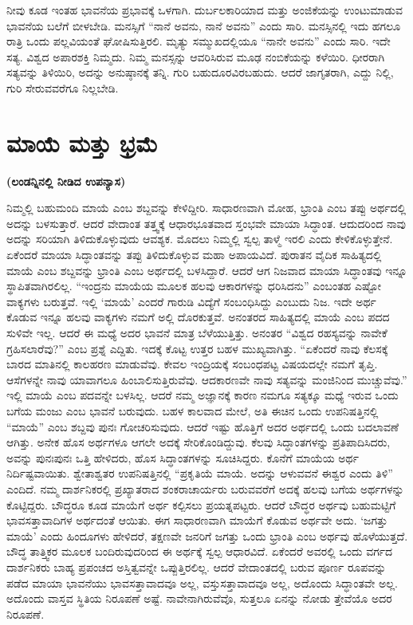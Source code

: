ನೀವು ಕೂಡ ಇಂತಹ ಭಾವನೆಯ ಪ್ರಭಾವಕ್ಕೆ ಒಳಗಾಗಿ. ದುರ್ಬಲಕಾರಿಯಾದ ಮತ್ತು ಅಂಜಿಕೆಯನ್ನು ಉಂಟುಮಾಡುವ ಭಾವನೆಯ ಬಲೆಗೆ ಬೀಳಬೇಡಿ. ಮನಸ್ಸಿಗೆ “ನಾನೆ ಅವನು, ನಾನೆ ಅವನು” ಎಂದು ಸಾರಿ. ಮನಸ್ಸಿನಲ್ಲಿ ಇದು ಹಗಲೂ ರಾತ್ರಿ ಒಂದು ಪಲ್ಲವಿಯಂತೆ ಘೋಷಿಸುತ್ತಿರಲಿ. ಮೃತ್ಯು ಸಮ್ಮುಖದಲ್ಲಿಯೂ “ನಾನೇ ಅವನು” ಎಂದು ಸಾರಿ. ಇದೇ ಸತ್ಯ. ವಿಶ್ವದ ಅಪಾರಶಕ್ತಿ ನಿಮ್ಮದು. ನಿಮ್ಮ ಮನಸ್ಸನ್ನು ಆವರಿಸಿರುವ ಮೂಢ ನಂಬಿಕೆಯನ್ನು ಕಳೆಯಿರಿ. ಧೀರರಾಗಿ ಸತ್ಯವನ್ನು ತಿಳಿಯಿರಿ, ಅದನ್ನು ಅನುಷ್ಠಾನಕ್ಕೆ ತನ್ನಿ. ಗುರಿ ಬಹುದೂರವಿರಬಹುದು. ಆದರೆ ಜಾಗೃತರಾಗಿ, ಎದ್ದು ನಿಲ್ಲಿ, ಗುರಿ ಸೇರುವವರೆಗೂ ನಿಲ್ಲಬೇಡಿ.

\chapter{ಮಾಯೆ ಮತ್ತು ಭ್ರಮೆ}

\centerline{\textbf{(ಲಂಡನ್ನಿನಲ್ಲಿ ನೀಡಿದ ಉಪನ್ಯಾಸ)}}

ನಿಮ್ಮಲ್ಲಿ ಬಹುಮಂದಿ ಮಾಯೆ ಎಂಬ ಶಬ್ದವನ್ನು ಕೇಳಿದ್ದೀರಿ. ಸಾಧಾರಣವಾಗಿ ಮೋಹ, ಭ್ರಾಂತಿ ಎಂಬ ತಪ್ಪು ಅರ್ಥದಲ್ಲಿ ಅದನ್ನು ಬಳಸುತ್ತಾರೆ. ಆದರೆ ವೇದಾಂತ ತತ್ತ್ವಕ್ಕೆ ಆಧಾರಭೂತವಾದ ಸ್ತಂಭವೇ ಮಾಯಾ ಸಿದ್ಧಾಂತ. ಆದುದರಿಂದ ನಾವು ಅದನ್ನು ಸರಿಯಾಗಿ ತಿಳಿದುಕೊಳ್ಳುವುದು ಆವಶ್ಯಕ. ಮೊದಲು ನಿಮ್ಮಲ್ಲಿ ಸ್ವಲ್ಪ ತಾಳ್ಮೆ ಇರಲಿ ಎಂದು ಕೇಳಿಕೊಳ್ಳುತ್ತೇನೆ. ಏಕೆಂದರೆ ಮಾಯಾ ಸಿದ್ಧಾಂತವನ್ನು ತಪ್ಪು ತಿಳಿದುಕೊಳ್ಳುವ ಮಹಾ ಅಪಾಯವಿದೆ. ಪುರಾತನ ವೈದಿಕ ಸಾಹಿತ್ಯದಲ್ಲಿ ಮಾಯೆ ಎಂಬ ಶಬ್ದವನ್ನು ಭ್ರಾಂತಿ ಎಂಬ ಅರ್ಥದಲ್ಲಿ ಬಳಸಿದ್ದಾರೆ. ಆದರೆ ಆಗ ನಿಜವಾದ ಮಾಯಾ ಸಿದ್ಧಾಂತವು ಇನ್ನೂ ಸ್ಥಾಪಿತವಾಗಿರಲಿಲ್ಲ. “ಇಂದ್ರನು ಮಾಯೆಯ ಮೂಲಕ ಹಲವು ಆಕಾರಗಳನ್ನು ಧರಿಸಿದನು” ಎಂಬಂತಹ ಎಷ್ಟೋ ವಾಕ್ಯಗಳು ಬರುತ್ತವೆ. ಇಲ್ಲಿ ‘ಮಾಯೆ’ ಎಂದರೆ ಗಾರುಡಿ ವಿದ್ಯೆಗೆ ಸಂಬಂಧಿಸಿದ್ದು ಎಂಬುದು ನಿಜ. ಇದೇ ಅರ್ಥ ಕೊಡುವ ಇನ್ನೂ ಹಲವು ವಾಕ್ಯಗಳು ನಮಗೆ ಅಲ್ಲಿ ದೊರಕುತ್ತವೆ. ಅನಂತರದ ಸಾಹಿತ್ಯದಲ್ಲಿ ಮಾಯೆ ಎಂಬ ಪದದ ಸುಳಿವೇ ಇಲ್ಲ. ಆದರೆ ಈ ಮಧ್ಯೆ ಅದರ ಭಾವನೆ ಮಾತ್ರ ಬೆಳೆಯುತ್ತಿತ್ತು. ಅನಂತರ “ವಿಶ್ವದ ರಹಸ್ಯವನ್ನು ನಾವೇಕೆ ಗ್ರಹಿಸಲಾರೆವು?” ಎಂಬ ಪ್ರಶ್ನೆ ಎದ್ದಿತು. ಇದಕ್ಕೆ ಕೊಟ್ಟ ಉತ್ತರ ಬಹಳ ಮುಖ್ಯವಾಗಿತ್ತು. “ಏಕೆಂದರೆ ನಾವು ಕೆಲಸಕ್ಕೆ ಬಾರದ ಮಾತಿನಲ್ಲಿ ಕಾಲಹರಣ ಮಾಡುವೆವು. ಕೇವಲ ಇಂದ್ರಿಯಕ್ಕೆ ಸಂಬಂಧಪಟ್ಟ ವಿಷಯದಲ್ಲೇ ನಮಗೆ ತೃಪ್ತಿ. ಆಸೆಗಳನ್ನೇ ನಾವು ಯಾವಾಗಲೂ ಹಿಂಬಾಲಿಸುತ್ತಿರುವೆವು. ಆದಕಾರಣವೇ ನಾವು ಸತ್ಯವನ್ನು ಮಂಜಿನಿಂದ ಮುಚ್ಚುವೆವು.” ಇಲ್ಲಿ ಮಾಯೆ ಎಂಬ ಪದವನ್ನೇ ಬಳಸಿಲ್ಲ. ಆದರೆ ನಮ್ಮ ಅಜ್ಞಾನಕ್ಕೆ ಕಾರಣ ನಮಗೂ ಸತ್ಯಕ್ಕೂ ಮಧ್ಯೆ ಇರುವ ಒಂದು ಬಗೆಯ ಮಂಜು ಎಂಬ ಭಾವನೆ ಬರುವುದು. ಬಹಳ ಕಾಲವಾದ ಮೇಲೆ, ಅತಿ ಈಚಿನ ಒಂದು ಉಪನಿಷತ್ತಿನಲ್ಲಿ “ಮಾಯೆ” ಎಂಬ ಶಬ್ದವು ಪುನಃ ಗೋಚರಿಸುವುದು. ಆದರೆ ಇಷ್ಟು ಹೊತ್ತಿಗೆ ಅದರ ಅರ್ಥದಲ್ಲಿ ಒಂದು ಬದಲಾವಣೆ ಆಗಿತ್ತು. ಅನೇಕ ಹೊಸ ಅರ್ಥಗಳೂ ಆಗಲೇ ಅದಕ್ಕೆ ಸೇರಿಕೊಂಡಿದ್ದುವು. ಕೆಲವು ಸಿದ್ಧಾಂತಗಳನ್ನು ಪ್ರತಿಪಾದಿಸಿದರು, ಅವನ್ನು ಪುನಃಪುನಃ ಒತ್ತಿ ಹೇಳಿದರು, ಹೊಸ ಸಿದ್ಧಾಂತಗಳನ್ನು ಸೂಚಿಸಿದ್ದರು. ಕೊನೆಗೆ ಮಾಯೆಯ ಅರ್ಥ ನಿರ್ದಿಷ್ಟವಾಯಿತು. ಶ್ವೇತಾಶ್ವತರ ಉಪನಿಷತ್ತಿನಲ್ಲಿ “ಪ್ರಕೃತಿಯೆ ಮಾಯೆ. ಅದನ್ನು ಆಳುವವನೆ ಈಶ್ವರ ಎಂದು ತಿಳಿ” ಎಂದಿದೆ. ನಮ್ಮ ದಾರ್ಶನಿಕರಲ್ಲಿ ಪ್ರಖ್ಯಾತರಾದ ಶಂಕರಾಚಾರ್ಯರು ಬರುವವರೆಗೆ ಅದಕ್ಕೆ ಹಲವು ಬಗೆಯ ಅರ್ಥಗಳನ್ನು ಕೊಟ್ಟಿದ್ದರು. ಬೌದ್ಧರೂ ಕೂಡ ಮಾಯೆಗೆ ಅರ್ಥ ಕಲ್ಪಿಸಲು ಪ್ರಯತ್ನಪಟ್ಟರು. ಆದರೆ ಬೌದ್ಧರ ಅರ್ಥವು ಬಹುಮಟ್ಟಿಗೆ ಭಾವಸತ್ತಾವಾದಿಗಳ ಅರ್ಥದಂತೆ ಆಯಿತು. ಈಗ ಸಾಧಾರಣವಾಗಿ ಮಾಯೆಗೆ ಕೊಡುವ ಅರ್ಥವೇ ಅದು. ‘ಜಗತ್ತು ಮಾಯೆ’ ಎಂದು ಹಿಂದೂಗಳು ಹೇಳಿದರೆ, ತಕ್ಷಣವೇ ಜನರಿಗೆ ಜಗತ್ತು ಒಂದು ಭ್ರಾಂತಿ ಎಂಬ ಅರ್ಥವು ಹೊಳೆಯುತ್ತದೆ. ಬೌದ್ಧ ತಾತ್ತ್ವಿಕರ ಮೂಲಕ ಬಂದಿರುವುದರಿಂದ ಈ ಅರ್ಥಕ್ಕೆ ಸ್ವಲ್ಪ ಆಧಾರವಿದೆ. ಏಕೆಂದರೆ ಅವರಲ್ಲಿ ಒಂದು ವರ್ಗದ ದಾರ್ಶನಿಕರು ಬಾಹ್ಯ ಪ್ರಪಂಚದ ಅಸ್ತಿತ್ವವನ್ನೇ ಒಪ್ಪುತ್ತಿರಲಿಲ್ಲ. ಆದರೆ ವೇದಾಂತದಲ್ಲಿ ಬರುವ ಪೂರ್ಣ ರೂಪವನ್ನು ಪಡೆದ ಮಾಯಾ ಭಾವನೆಯು ಭಾವಸತ್ತಾವಾದವೂ ಅಲ್ಲ, ವಸ್ತುಸತ್ತಾವಾದವೂ ಅಲ್ಲ, ಅದೊಂದು ಸಿದ್ಧಾಂತವೇ ಅಲ್ಲ. ಅದೊಂದು ವಾಸ್ತವ ಸ್ಥಿತಿಯ ನಿರೂಪಣೆ ಅಷ್ಟೆ. ನಾವೇನಾಗಿರುವೆವೊ, ಸುತ್ತಲೂ ಏನನ್ನು ನೋಡು ತ್ತೇವೆಯೊ ಅದರ ನಿರೂಪಣೆ.

